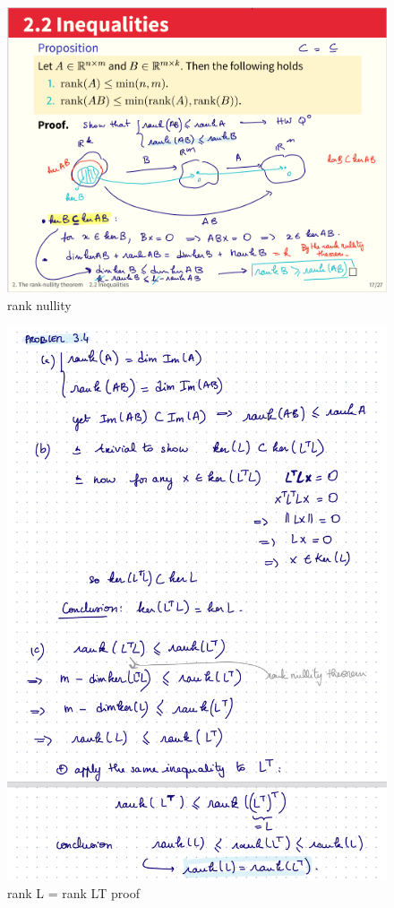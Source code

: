 \documentclass[12pt,twoside]{article}
\begin{document}
\begin{figure}[h]
    \centering
    \includegraphics[scale=.45]{screenshots/rank nullity p1.png}
    \caption{rank nullity}
    \label{fig:my_label}
\end{figure}

\begin{figure}[h]
    \centering
    \includegraphics[scale=.7]{screenshots/rank L = rank LT proof.png}
    \caption{rank L = rank LT proof}
    \label{fig:my_label}
\end{figure}
\end{document}
